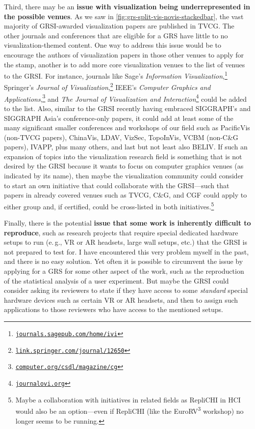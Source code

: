 \documentclass[conference]{vgtc}                     %
\newcommand{\eg}{e.\,g.}
\begin{document}
Third, there may be an \textbf{issue with visualization being underrepresented in the possible venues}. As we saw in \autoref{fig:grs-split-vis-novis-stackedbar}, the vast majority of GRSI-awarded visualization papers are published in TVCG. The other journals and conferences that are eligible for a GRS have little to no visualization-themed content. One way to address this issue would be to encourage the authors of visualization papers in those other venues to apply for the stamp, another is to add more core visualization venues to the list of venues to the GRSI. For instance, journals like Sage's \emph{Information Visualization},\footnote{\href{https://journals.sagepub.com/home/ivi}{\texttt{journals.sagepub.com/home/ivi}}} Springer's \emph{Journal of Visualization},\footnote{\href{https://link.springer.com/journal/12650}{\texttt{link.springer.com/journal/12650}}} IEEE's \emph{Computer Graphics and Applications},\footnote{\href{https://www.computer.org/csdl/magazine/cg}{\texttt{computer.org/csdl/magazine/cg}}} and \emph{The Journal of Visualization and Interaction}\footnote{\href{https://www.journalovi.org/}{\texttt{journalovi.org}}} could be added to the list. Also, similar to the GRSI recently having embraced SIGGRAPH's and SIGGRAPH Asia's conference-only papers, it could add at least some of the many significant smaller conferences and workshops of our field such as PacificVis (non-TVCG papers), ChinaVis, LDAV, VizSec, TopoInVis, VCBM (non-C\&G papers), IVAPP, plus many others, and last but not least also BELIV. If such an expansion of topics into the visualization research field is something that is not desired by the GRSI because it wants to focus on computer graphics venues (as indicated by its name), then maybe the visualization community could consider to start an own initiative that could collaborate with the GRSI---such that papers in already covered venues such as TVCG, C\&G, and CGF could apply to either group and, if certified, could be cross-listed in both initiatives.\footnote{Maybe a collaboration with initiatives in related fields as RepliCHI in HCI \cite{Wilson:2012:RCF,Wilson:2013:RW,Wilson:2014:RW2} would also be an option---even if RepliCHI (like the EuroRV\textsuperscript{3} workshop) no longer seems to be running.}

Finally, there is the potential \textbf{issue that some work is inherently difficult to reproduce}, such as research projects that require special dedicated hardware setups to run (\eg, VR or AR headsets, large wall setups, etc.) that the GRSI is not prepared to test for. I have encountered this very problem myself in the past, and there is no easy solution. Yet often it is possible to circumvent the issue by applying for a GRS for some other aspect of the work, such as the reproduction of the statistical analysis of a user experiment. But maybe the GRSI could consider asking its reviewers to state if they have access to some \emph{standard} special hardware devices such as certain VR or AR headsets, and then to assign such applications to those reviewers who have access to the mentioned setups.
\end{document}
